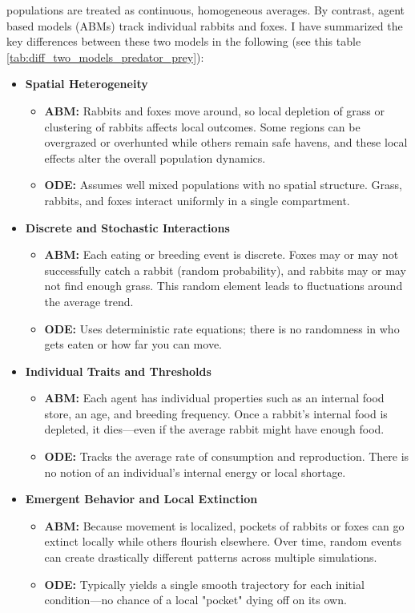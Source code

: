 populations are treated as continuous, homogeneous averages. By contrast, agent based models (ABMs) track individual rabbits and foxes.
I have summarized the key differences between these two models in the following (see this table \ref{tab:diff_two_models_predator_prey}):

\begin{itemize}
    \item \textbf{Spatial Heterogeneity}
    \begin{itemize}
        \item \textbf{ABM:} Rabbits and foxes move around, so local depletion of grass or clustering of rabbits affects local outcomes. Some regions can be overgrazed or overhunted while others remain safe havens, and these local effects alter the overall population dynamics.
        \item \textbf{ODE:} Assumes well mixed populations with no spatial structure. Grass, rabbits, and foxes interact uniformly in a single compartment.
    \end{itemize}
    
    \item \textbf{Discrete and Stochastic Interactions}
    \begin{itemize}
        \item \textbf{ABM:} Each eating or breeding event is discrete. Foxes may or may not successfully catch a rabbit (random probability), and rabbits may or may not find enough grass. This random element leads to fluctuations around the average trend.
        \item \textbf{ODE:} Uses deterministic rate equations; there is no randomness in who gets eaten or how far you can move.
    \end{itemize}
    
    \item \textbf{Individual Traits and Thresholds}
    \begin{itemize}
        \item \textbf{ABM:} Each agent has individual properties such as an internal food store, an age, and breeding frequency. Once a rabbit's internal food is depleted, it dies—even if the average rabbit might have enough food.
        \item \textbf{ODE:} Tracks the average rate of consumption and reproduction. There is no notion of an individual's internal energy or local shortage.
    \end{itemize}
    
    \item \textbf{Emergent Behavior and Local Extinction}
    \begin{itemize}
        \item \textbf{ABM:} Because movement is localized, pockets of rabbits or foxes can go extinct locally while others flourish elsewhere. Over time, random events can create drastically different patterns across multiple simulations.
        \item \textbf{ODE:} Typically yields a single smooth trajectory for each initial condition—no chance of a local "pocket" dying off on its own.
    \end{itemize}
    

\end{itemize}
